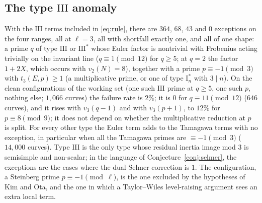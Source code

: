 \documentclass[11pt]{amsart}
\theoremstyle{definition}
\begin{document}
\begin{table}[ht]
\centering\footnotesize

\caption{Verification counts for the two corollary forms. ``\eqref{eq:main} $>0$'' is the number of curves with $E[\ell]$ irreducible, not CM, for which the right-hand side of \eqref{eq:main} is positive, and ``viol.'' the number of violations; likewise for \eqref{eq:twist}. The last column counts the Eisenstein curves with a positive bound in \eqref{eq:main} and the violations of Conjecture~\ref{conj:eis}.}\label{tab:counts}
\end{table}

\subsection{The type \texorpdfstring{$\mathrm{III}$}{III} anomaly}\label{sec:anomaly}
With the $\mathrm{III}$ terms included in \eqref{eq:rule}, there are $364$, $68$, $43$ and $0$ exceptions on the four ranges, all at $\ell=3$, all with shortfall exactly one, and all of one shape: a prime $q$ of type $\mathrm{III}$ or $\mathrm{III}^*$ whose Euler factor is nontrivial with Frobenius acting trivially on the invariant line ($q\equiv1\pmod{12}$ for $q\ge5$; at $q=2$ the factor $1+2X$, which occurs with $v_2(N)=8$), together with a prime $p\equiv-1\pmod3$ with $t_3(E,p)\ge1$ (a multiplicative prime, or one of type $\mathrm{I}_n^*$ with $3\mid n$). On the clean configurations of the working set (one such $\mathrm{III}$ prime at $q\ge5$, one such $p$, nothing else; $1{,}066$ curves) the failure rate is $2\%$; it is $0$ for $q\equiv11\pmod{12}$ ($646$ curves), and it rises with $v_3(q-1)$ and with $v_3(p+1)$, to $12\%$ for $p\equiv8\pmod9$; it does not depend on whether the multiplicative reduction at $p$ is split. For every other type the Euler term adds to the Tamagawa terms with no exception, in particular when all the Tamagawa primes are $\equiv-1\pmod3$ ($14{,}000$ curves). Type $\mathrm{III}$ is the only type whose residual inertia image mod $3$ is semisimple and non-scalar; in the language of Conjecture~\ref{conj:selmer}, the exceptions are the cases where the dual Selmer correction is $1$. The configuration, a Steinberg prime $p\equiv-1\pmod\ell$, is the one excluded by the hypotheses of Kim and Ota, and the one in which a Taylor--Wiles level-raising argument sees an extra local term.
\end{document}
